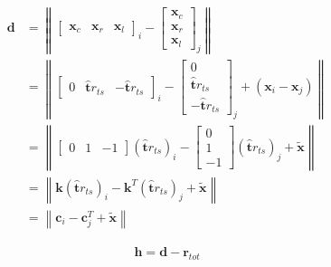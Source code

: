 \begin{align}
\mathbf{d} &= \left\|\begin{bmatrix} \mathbf{x}_{c} & \mathbf{x}_{r} & \mathbf{x}_{l} \end{bmatrix}_{i} - \begin{bmatrix} \mathbf{x}_{c} \\ \mathbf{x}_{r} \\ \mathbf{x}_{l} \end{bmatrix}_{j}\right\|
\\
&= \left\|\begin{bmatrix} 0 & \hat{\mathbf{t}} r_{ts} & -\hat{\mathbf{t}} r_{ts} \end{bmatrix}_{i} - \begin{bmatrix} 0 \\ \hat{\mathbf{t}} r_{ts} \\ -\hat{\mathbf{t}} r_{ts} \end{bmatrix}_{j}  + (\mathbf{x}_{i} - \mathbf{x}_{j}) \right\|
\\
&= \left\|\begin{bmatrix} 0 & 1 & -1 \end{bmatrix} \left(\hat{\mathbf{t}} r_{ts}\right)_{i} - \begin{bmatrix} 0 \\ 1 \\ -1 \end{bmatrix} \left(\hat{\mathbf{t}} r_{ts}\right)_{j}  + \tilde{\mathbf{x}} \right\|
\\
&= \left\| \mathbf{k} \left(\hat{\mathbf{t}} r_{ts}\right)_{i} - \mathbf{k}^{T} \left(\hat{\mathbf{t}} r_{ts}\right)_{j}  + \tilde{\mathbf{x}} \right\|
\\
&= \left\| \mathbf{c}_{i} - \mathbf{c}_{j}^{T}  + \tilde{\mathbf{x}} \right\|
\end{align}

\begin{align}
\mathbf{h} = \mathbf{d} - \mathbf{r}_{tot}
\end{align}

